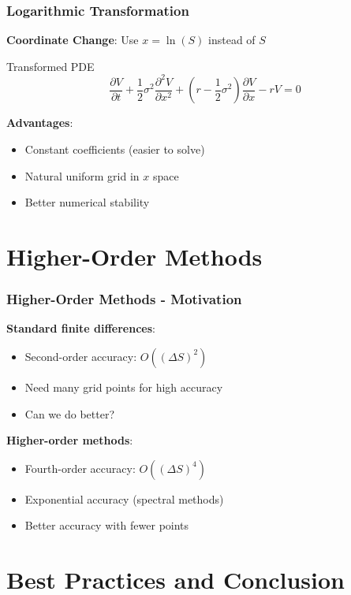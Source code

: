\documentclass[aspectratio=169]{beamer}
\begin{document}
\begin{frame}
\frametitle{Logarithmic Transformation}
\textbf{Coordinate Change}: Use \(x = \ln(S)\) instead of \(S\)

\begin{block}{Transformed PDE}
\[\frac{\partial V}{\partial t} + \frac{1}{2}\sigma^2 \frac{\partial^2 V}{\partial x^2} + \left(r - \frac{1}{2}\sigma^2\right) \frac{\partial V}{\partial x} - rV = 0\]
\end{block}

\textbf{Advantages}:
\begin{itemize}
\item Constant coefficients (easier to solve)
\item Natural uniform grid in \(x\) space
\item Better numerical stability
\end{itemize}
\end{frame}

\section{Higher-Order Methods}

\begin{frame}
\frametitle{Higher-Order Methods - Motivation}
\textbf{Standard finite differences}:
\begin{itemize}
\item Second-order accuracy: \(O((\Delta S)^2)\)
\item Need many grid points for high accuracy
\item Can we do better?
\end{itemize}

\textbf{Higher-order methods}:
\begin{itemize}
\item Fourth-order accuracy: \(O((\Delta S)^4)\)
\item Exponential accuracy (spectral methods)
\item Better accuracy with fewer points
\end{itemize}
\end{frame}

\section{Best Practices and Conclusion}
\end{document}
